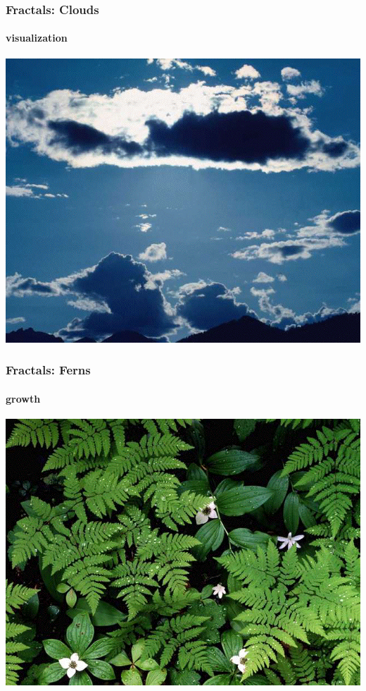 \documentclass[10pt]{beamer}
\begin{document}
\begin{frame}
\frametitle{Fractals: Clouds}
\framesubtitle{visualization}
\begin{center}
\includegraphics[height=0.9\textheight]{figs/fractal10}
\end{center}
\end{frame}
\begin{frame}
\frametitle{Fractals: Ferns}
\framesubtitle{growth}
\begin{center}
\includegraphics[height=0.9\textheight]{figs/fractal11}
\end{center}
\end{frame}
\end{document}
